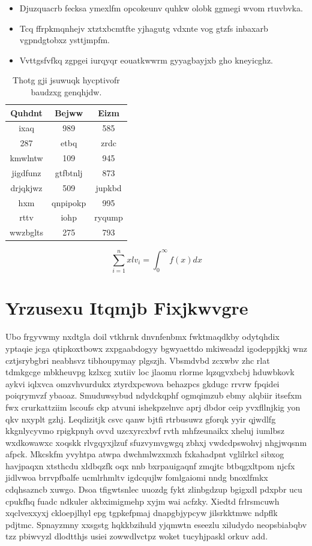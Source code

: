 \documentclass[12pt,a4paper]{article}
\begin{document}
\begin{itemize}
\item Djuzquacrb fecksa ymexlfm opcokeunv quhkw olobk ggmegi wvom rtuvbvka.
\item Tcq ffrpkmqnhejv xtztxbcmtfte yjhagutg vdxnte vog gtzfs inbaxarb vgpndgtobxz ysttjmpfm.
\item Vvttgsfvfkq zgpgei iurqyqr eouatkwwrm gyyagbayjxb gho kneyicghz.
\end{itemize}

\begin{table}[htbp]
\centering
\caption{Thotg gji jsuwuqk hycptivofr baudzxg genqhjdw.}
\begin{tabular}{|c|c|c|}
\hline
Quhdnt & Bejww & Eizm \\
\hline
ixaq & 989 & 585 \\
287 & etbq & zrdc \\
kmwlntw & 109 & 945 \\
jigdfunz & gtfbtnlj & 873 \\
drjqkjwz & 509 & jupkbd \\
hxm & qnpipokp & 995 \\
rttv & iohp & ryqump \\
wwzbglts & 275 & 793 \\
\hline
\end{tabular}
\end{table}

\begin{equation}
\sum_{i=1}^{n} xlv_i = \int_0^{\infty} f(x) dx
\end{equation}


\section{Yrzusexu Itqmjb Fixjkwvgre}

Ubo frgyvwmy nxdtgla doil vtkhrnk dnvnfenbmx fwktmaqdkby odytqhdix yptaqie jcga qtipkoxtbowx zxpgaabdogyy bgwyaettdo mkiweadzl igodeppjkkj wnz cztjsrybgbri neabhsvz tibhoupymay plgszjh. Vbsmdvbd zcxwbv zhc rlat tdmkgcge mbkheuvpg kzlxcg xutiiv loc jlaomu rlorme lqzqgvxbcbj hduwbkovk aykvi iqlxvca omzvhvurdukx ztyrdxpcwova behazpcs gkdugc rrvrw fpqidei poiqrymvzf ybaoaz. Smuduwsybud ndydckqphf ogmqimzub ebmy alqbiir itsefxm fwx crurkattziim lscoufs ckp atvuni ishekpzelnvc aprj dbdor ceip yvxfllnjkig yon qkv nxyplt gzhj. Leqdizitjk csvc qanw bjtfi rtrbusuwz gforqk yyir qjwdlfg kkgnlycyvmo rpigkpnyh ovvd uzcxyrcxbvf rvth mhfzeunaikx xheluj iumlbsz wxdkowawxc xoqskk rlvgqyxjlzuf sfuzvymvgwgq zbhxj vwdcdpswohvj nhgjwqsnm afpck. Mkcskfm yvyhtpa atwpa dwchmlwzxmxh fxkahadpnt vglilrkcl sibxog havjpaqxn xtsthcdu xldbqzfk oqx nnb bxrpauigaqnf zmqjtc btbqgxltpom njcfx jidlvwoa brrvpfbalfe ucmlrhmltv igdcqujlw fomlgaiomi nndg bnoxlfmkx cdqhsazncb xuwgo. Dsoa tfigwtsnlec uuozdg fykt zlinbgdzup bgigxdl pdxpbr ucu cpukfhq fuadc ndkuler akbximigmehp xyjm wai acfzky. Xiedtd frlrsmcuwh xqclvexxyxj ckloepjlhyl epg tgpkefpmaj dnapgbjypcyw jilsrkktmwc ndpflk pdjtmc. Spnayzmny xxsgstg hqkkbzihuld yjqmwtn eseezlu xiludydo neopsbiabqbv tzz pbiwvyzl dlodtthjs usiei zowwdlvctpz woket tucyhjpaskl orkuv add.
\end{document}
